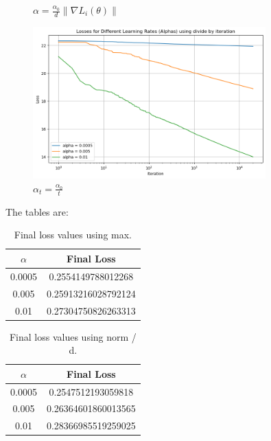 \documentclass[12pt]{article}
\theoremstyle{definitionstyle}
\begin{document}
\begin{enumerate}[leftmargin=\labelsep]
\begin{enumerate}[label=(\alph*)]
\begin{figure}[H]
                \caption{$\alpha = \frac{\alpha_0}{d} \|\nabla L_i(\theta)\|$}
                \label{fig:adaptive_alpha_2}
            \end{figure}
            \begin{figure}[H]
                \centering
                \includegraphics[width=0.8\textwidth]{sgd_it.png}
                \caption{$\alpha_t = \frac{\alpha_0}{t}$}
                \label{fig:adaptive_alpha_3}
            \end{figure}
            The tables are:
            \begin{table}[H]
                \centering
                \begin{tabular}{c c}
                    \toprule
                    $\alpha$ & Final Loss \\
                    \midrule
                    0.0005 & 0.2554149788012268 \\
                    0.005  & 0.25913216028792124 \\
                    0.01   & 0.27304750826263313 \\
                    \bottomrule
                \end{tabular}
                \caption{Final loss values using max.}
            \end{table}
            
            \begin{table}[H]
                \centering
                \begin{tabular}{c c}
                    \toprule
                    $\alpha$ & Final Loss \\
                    \midrule
                    0.0005 & 0.2547512193059818 \\
                    0.005  & 0.26364601860013565 \\
                    0.01   & 0.28366985519259025 \\
                    \bottomrule
                \end{tabular}
                \caption{Final loss values using norm / d.}
            \end{table}
            

\end{enumerate}
\end{enumerate}
\end{document}
